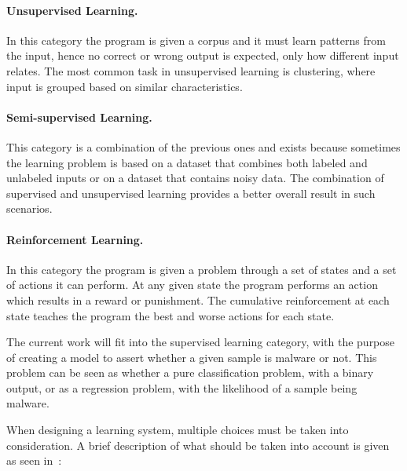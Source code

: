 \paragraph{Unsupervised Learning.} In this category the program is given a corpus and it must learn patterns from the input, hence no correct or wrong output is expected, only how different input relates.
The most common task in unsupervised learning is clustering, where input is grouped based on similar characteristics.

\paragraph{Semi-supervised Learning.} This category is a combination of the previous ones and exists because sometimes the learning problem is based on a dataset that combines both labeled and unlabeled inputs or on a dataset that contains noisy data. 
The combination of supervised and unsupervised learning provides a better overall result in such scenarios.

\paragraph{Reinforcement Learning.} In this category the program is given a problem through a set of states and a set of actions it can perform.
At any given state the program performs an action which results in a reward or punishment.
The cumulative reinforcement at each state teaches the program the best and worse actions for each state.

\medskip

The current work will fit into the supervised learning category, with the purpose of creating a model to assert whether a given sample is malware or not.
This problem can be seen as whether a pure classification problem, with a binary output, or as a regression problem, with the likelihood of a sample being malware.

\medskip

When designing a learning system, multiple choices must be taken into consideration.
A brief description of what should be taken into account is given as seen in~\cite{mitchell:ml}:


